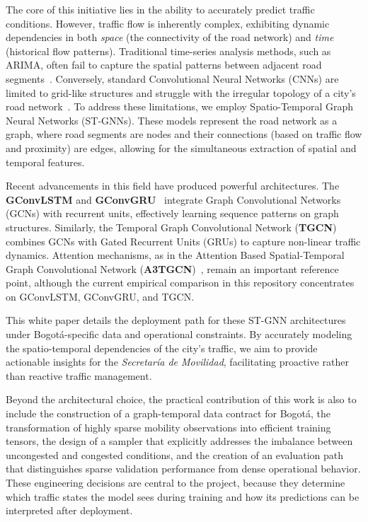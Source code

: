 \documentclass[11pt, a4paper]{article}
\begin{document}
The core of this initiative lies in the ability to accurately predict traffic conditions. However, traffic flow is inherently complex, exhibiting dynamic dependencies in both \textit{space} (the connectivity of the road network) and \textit{time} (historical flow patterns). Traditional time-series analysis methods, such as ARIMA, often fail to capture the spatial patterns between adjacent road segments~\cite{chen2024st}. Conversely, standard Convolutional Neural Networks (CNNs) are limited to grid-like structures and struggle with the irregular topology of a city's road network~\cite{zhang2024adaptive}. To address these limitations, we employ Spatio-Temporal Graph Neural Networks (ST-GNNs). These models represent the road network as a graph, where road segments are nodes and their connections (based on traffic flow and proximity) are edges, allowing for the simultaneous extraction of spatial and temporal features.

Recent advancements in this field have produced powerful architectures. The \textbf{GConvLSTM} and \textbf{GConvGRU}~\cite{seo_gcrn} integrate Graph Convolutional Networks (GCNs) with recurrent units, effectively learning sequence patterns on graph structures. Similarly, the Temporal Graph Convolutional Network (\textbf{TGCN})~\cite{zhao_tgcn} combines GCNs with Gated Recurrent Units (GRUs) to capture non-linear traffic dynamics. Attention mechanisms, as in the Attention Based Spatial-Temporal Graph Convolutional Network (\textbf{A3TGCN})~\cite{zhu_a3tgcn}, remain an important reference point, although the current empirical comparison in this repository concentrates on GConvLSTM, GConvGRU, and TGCN.

This white paper details the deployment path for these ST-GNN architectures under Bogotá-specific data and operational constraints. By accurately modeling the spatio-temporal dependencies of the city's traffic, we aim to provide actionable insights for the \textit{Secretaría de Movilidad}, facilitating proactive rather than reactive traffic management.

Beyond the architectural choice, the practical contribution of this work is also to include the construction of a graph-temporal data contract for Bogotá, the transformation of highly sparse mobility observations into efficient training tensors, the design of a sampler that explicitly addresses the imbalance between uncongested and congested conditions, and the creation of an evaluation path that distinguishes sparse validation performance from dense operational behavior.
These engineering decisions are central to the project, because they determine which traffic states the model sees during training and how its predictions can be interpreted after deployment.
\end{document}
